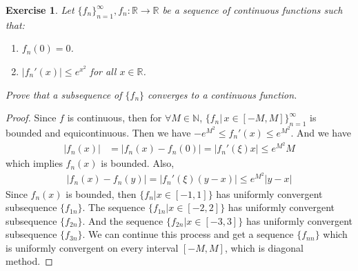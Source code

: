 \documentclass[12pt,leqno]{amsart}
\newtheorem{exercise}{Exercise}[section]
\theoremstyle{definition}
\numberwithin{equation}{subsection}
\begin{document}
\medskip

\begin{exercise}
Let $\{f_n\}^\infty_{n=1}, f_n:\mathbb{R}\to\mathbb{R}$ be a sequence of continuous functions such that:
\begin{enumerate}
    \item $f_n(0) = 0$.
    \item $|f_{n}'(x)|\leq e^{x^2}$ for all $x\in\mathbb{R}$.
\end{enumerate}
Prove that a subsequence of $\{f_n\}$ converges to a continuous function.
\end{exercise}
\begin{proof}
Since $f$ is continuous, then for $\forall M \in\mathbb{N}$, $\{f_n |\, x\in [-M,M]\}^\infty_{n = 1}$ is bounded and equicontinuous. Then we have $-e^{M^2} \leq f_n'(x) \leq e^{M^2}$. And we have
\begin{align*}
    \left|f_n(x)\right| & = \left|f_n(x) - f_n(0)\right| = \left|f_n'(\xi) x\right| \leq e^{M^2}M
\end{align*}
which implies $f_n(x)$ is bounded. Also, 
\begin{align*}
    \left|f_n(x) - f_n(y)\right| = \left|f_n'(\xi)(y - x)\right| \leq e^{M^2}|y - x|
\end{align*}
Since $f_n(x)$ is bounded, then $\{f_n|x\in [-1,1]\}$ has uniformly convergent subsequence $\{f_{1n}\}$. The sequence $\{f_{1n}|x\in [-2,2]\}$ has uniformly convergent subsequence $\{f_{2n}\}$. And the sequence $\{f_{2n}|x\in [-3,3]\}$ has uniformly convergent subsequence $\{f_{3n}\}$. We can continue this process and get a sequence $\{f_{nn}\}$ which is uniformly convergent on every interval $[-M, M]$, which is diagonal method.
\end{proof}
\end{document}

